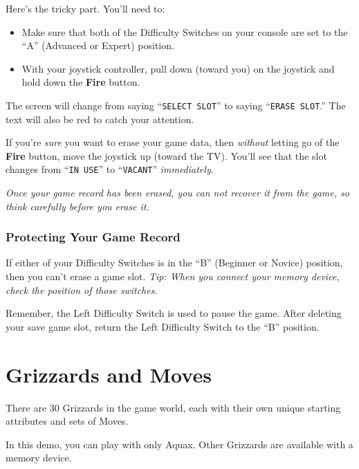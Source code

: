 \documentclass[10pt,twocolumn,openany,article]{memoir}
\begin{document}
\begin{description}
Here's the tricky part. You'll need to:

\begin{itemize}
\item Make sure that both of the Difficulty Switches on your console
  are set to the ``A'' (Advanced or Expert) position.
\item With your joystick controller, pull down (toward you) on the
  joystick and hold down the \textbf{Fire} button.
\end{itemize}

The screen  will change from  saying ``\texttt{SELECT SLOT}''  to saying
``\texttt{ERASE  SLOT}.''   The  text   will  also   be  red   to  catch
your attention.

If  you're  \emph{sure}   you  want  to  erase  your   game  data,  then
\emph{without}  letting go  of the  \textbf{Fire}  button, move  the joystick  up
(toward  the TV).  You'll see  that the  slot changes  from ``\texttt{IN
  USE}'' to ``\texttt{VACANT}'' \emph{immediately}.

\emph{Once your game record has been erased, you can not recover it from
  the game, so think carefully before you erase it.}

\subsection{Protecting Your Game Record}

If  either of  your Difficulty  Switches is  in the  ``B'' (Beginner  or
Novice) position, then you can't erase  a game slot. \emph{Tip: When you
  connect your memory device, check the position of those switches.}

\ifdefined\TVSECAM

Remember,  the  Left  Difficulty  Switch  is used  to  pause  the  game.
After deleting your save game slot, return the Left Difficulty Switch to
the ``B'' position.

\fi

\fi %
\chapter{Grizzards and Moves}

There are  30 Grizzards in  the game world,  each with their  own unique
starting attributes and sets of Moves.

\ifdefined\NOSAVE

In  this  demo, you  can  play  with  only  Aquax. Other  Grizzards  are
available with a memory device.


\end{description}
\end{document}

